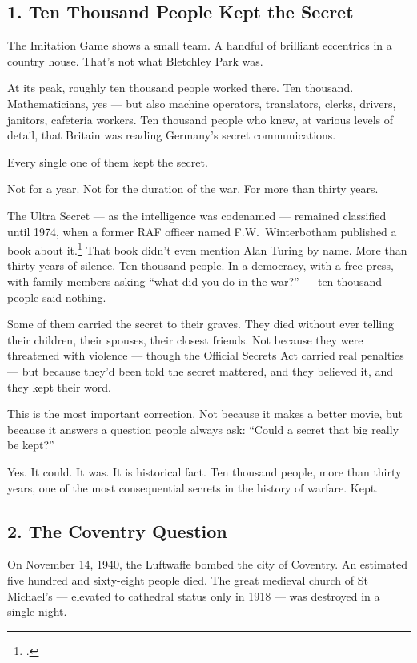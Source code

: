 \subsection*{1. Ten Thousand People Kept the Secret}
\label{pos04:ten-thousand-people-kept-the-secret}

The Imitation Game shows a small team. A handful of brilliant eccentrics in a country house. That's not what Bletchley Park was.

At its peak, roughly ten thousand people worked there. Ten thousand. Mathematicians, yes --- but also machine operators, translators, clerks, drivers, janitors, cafeteria workers. Ten thousand people who knew, at various levels of detail, that Britain was reading Germany's secret communications.

Every single one of them kept the secret.

Not for a year. Not for the duration of the war. For more than thirty years.

The Ultra Secret --- as the intelligence was codenamed --- remained classified until 1974, when a former RAF officer named F.W.\ Winterbotham published a book about it.\footcite{winterbotham1974} That book didn't even mention Alan Turing by name. More than thirty years of silence. Ten thousand people. In a democracy, with a free press, with family members asking ``what did you do in the war?'' --- ten thousand people said nothing.

Some of them carried the secret to their graves. They died without ever telling their children, their spouses, their closest friends. Not because they were threatened with violence --- though the Official Secrets Act carried real penalties --- but because they'd been told the secret mattered, and they believed it, and they kept their word.

This is the most important correction. Not because it makes a better movie, but because it answers a question people always ask: ``Could a secret that big really be kept?''

Yes. It could. It was. It is historical fact. Ten thousand people, more than thirty years, one of the most consequential secrets in the history of warfare. Kept.

\subsection*{2. The Coventry Question}
\label{pos04:the-coventry-question}

On November 14, 1940, the Luftwaffe bombed the city of Coventry. An estimated five hundred and sixty-eight people died. The great medieval church of St Michael's --- elevated to cathedral status only in 1918 --- was destroyed in a single night.


